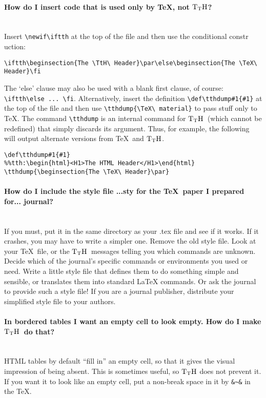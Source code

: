 \documentclass[12pt]{article}
\def\tthdump{}
\newif\iftth
\def\TtH{$\rm{}T_TH$}
\begin{document}
\paragraph{How do I insert code that is used only by \TeX, not \TtH?}\leavevmode\\
Insert \verb|\newif\iftth| at the top of the file and then use
the conditional constr
uction:
\begin{verbatim}\iftth\beginsection{The \TtH\ Header}\par\else\beginsection{The \TeX\ Header}\fi
\end{verbatim}
The `else' clause may also be used with a blank first clause, of
course: \verb|\iftth\else ... \fi|.
Alternatively, insert the definition \verb+\def\tthdump#1{#1}+ at the
top of the file and then use \verb+\tthdump{\TeX\ material}+ to pass
stuff only to \TeX. The command \verb+\tthdump+ is an internal command
for \TtH\ (which cannot be redefined) that simply discards its argument.
Thus, for example, the following will output
alternate versions from \TeX\ and \TtH.\begin{verbatim}
\def\tthdump#1{#1}
%%tth:\begin{html}<H1>The HTML Header</H1>\end{html}
\tthdump{\beginsection{The \TeX\ Header}\par}
\end{verbatim}

\paragraph{How do I include the style file ...sty for the \TeX\ paper I prepared for... journal?}\leavevmode\\ 
 If you must, put it in the same directory as your .tex file and see
 if it works. If it crashes, you may have to write a simpler one.
 Remove the old style file. Look at your \TeX\ file, or the
 \TtH\ messages telling you which commands are unknown. Decide which of
 the journal's specific commands or environments you used or
 need. Write a little style file that defines them to do something
 simple and sensible, or translates them into standard \LaTeX
 commands. Or ask the journal to provide such a style file! If you are
 a journal publisher, distribute your simplified style file to your
 authors.

\paragraph{In bordered tables I want an empty cell to look
empty. How do I make \TtH\ do that?}\leavevmode\\
HTML tables by default ``fill in'' an empty cell, so that it gives the
visual impression of being absent. This is sometimes useful, so \TtH
does not prevent it. If you want it to look like an empty cell, put a
non-break space in it by \verb+&~&+ in the \TeX.
\end{document}

